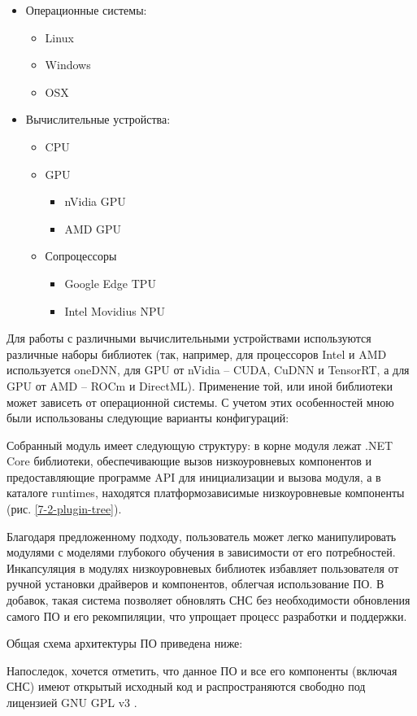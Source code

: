 \begin{itemize}
    \item Операционные системы:
    \begin{itemize}
        \item Linux
        \item Windows
        \item OSX
    \end{itemize}
    \item Вычислительные устройства:
    \begin{itemize}
        \item CPU
        \item GPU
        \begin{itemize}
            \item nVidia GPU
            \item AMD GPU
        \end{itemize}
        \item Сопроцессоры
        \begin{itemize}
            \item Google Edge TPU
            \item Intel Movidius NPU
        \end{itemize}
    \end{itemize}
\end{itemize}

Для работы с различными вычислительными устройствами используются различные наборы библиотек (так, например, для процессоров Intel и AMD используется oneDNN, для GPU от nVidia -- CUDA, CuDNN и TensorRT, а для GPU от AMD -- ROCm и DirectML). Применение той, или иной библиотеки может зависеть от операционной системы. С учетом этих особенностей мною были использованы следующие варианты конфигураций:


Собранный модуль имеет следующую структуру: в корне модуля лежат .NET Core библиотеки, обеспечивающие вызов низкоуровневых компонентов и предоставляющие программе API для инициализации и вызова модуля, а в каталоге runtimes, находятся платформозависимые низкоуровневые компоненты (рис. \ref{7-2-plugin-tree}).


Благодаря предложенному подходу, пользователь может легко манипулировать модулями с моделями глубокого обучения в зависимости от его потребностей. Инкапсуляция в модулях низкоуровневых библиотек избавляет пользователя от ручной установки драйверов и компонентов, облегчая использование ПО. В добавок, такая система позволяет обновлять СНС без необходимости обновления самого ПО и его рекомпиляции, что упрощает процесс разработки и поддержки.

Общая схема архитектуры ПО приведена ниже:


Напоследок, хочется отметить, что данное ПО и все его компоненты (включая СНС) имеют открытый исходный код и распространяются свободно под лицензией GNU GPL v3 \cite{lib-lacmus} \cite{lib-lacmus-app}.
